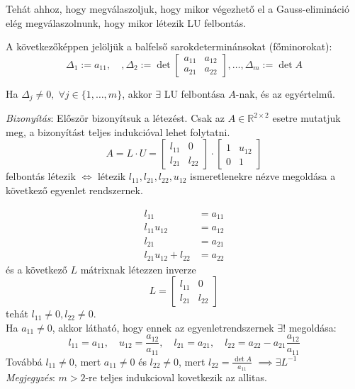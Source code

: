 Tehát ahhoz, hogy megválaszoljuk, hogy mikor végezhető el a Gauss-elimináció elég megválaszolnunk, hogy mikor létezik LU felbontás.

A következőképpen jelöljük a balfelső sarokdeterminánsokat (főminorokat):
\begin{equation*}
    \Delta_{1} := a_{11}, \quad, \Delta_{2} := \det \begin{bmatrix}
    a_{11} & a_{12} \\
    a_{21} & a_{22}
    \end{bmatrix}
    ,
    \dots,
    \Delta_{m} := \det A
\end{equation*}

\begin{allitas}
    Ha $\Delta_{j} \neq 0, \; \forall j \in \{1, \dots, m\}$, akkor $\exists$ LU felbontása $A$-nak, és az egyértelmű.
\end{allitas}
\textit{Bizonyítás}: Először bizonyítsuk a létezést. Csak az $A \in \mathbb{R}^{2 \times 2}$ esetre mutatjuk meg, a bizonyítást teljes indukcióval lehet folytatni.
$$
A = L \cdot U = 
\begin{bmatrix}
l_{11} & 0 \\
l_{21} & l_{22}
\end{bmatrix}
\cdot
\begin{bmatrix}
1 & u_{12} \\
0 & 1
\end{bmatrix}
$$
felbontás létezik $\iff$ létezik $l_{11}, l_{21}, l_{22}, u_{12}$ ismeretlenekre nézve megoldása a következő egyenlet rendszernek.

\begin{align*}
l_{11} & = a_{11} \\
l_{11} u_{12} & = a_{12} \\
l_{21} & = a_{21} \\
l_{21} u_{12} + l_{22} & = a_{22}
\end{align*}
és a következő $L$ mátrixnak létezzen inverze
$$
L = \begin{bmatrix}
l_{11} & 0 \\
l_{21} & l_{22}
\end{bmatrix}
$$
tehát $l_{11} \neq 0, l_{22} \neq 0$. \\
Ha $a_{11} \neq 0$, akkor látható, hogy ennek az egyenletrendszernek $\exists!$ megoldása:
\begin{equation*}
    l_{11} = a_{11}, \quad u_{12} = \frac{a_{12}}{a_{11}}, \quad l_{21} = a_{21}, \quad l_{22} = a_{22} - a_{21} \frac{a_{12}}{a_{11}}
\end{equation*}
Továbbá $l_{11} \neq 0$, mert $a_{11} \neq 0$ és $l_{22} \neq 0$, mert $l_{22} = \frac{\det A}{a_{11}}$ $\implies \exists L^{-1}$ \\
\textit{Megjegyzés}: $m > 2$-re teljes indukcioval kovetkezik az allitas.

